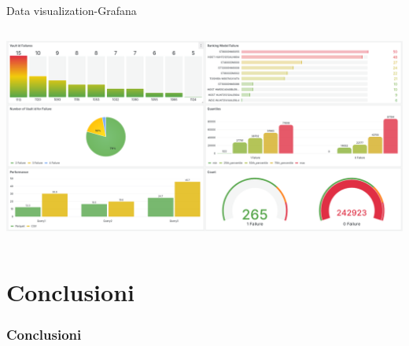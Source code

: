 \documentclass[13pt,aspectratio=169,t,xcolor=table]{beamer}
\begin{document}
\begin{frame}{Data visualization-Grafana}
\begin{columns}
\begin{minipage}{1\textwidth}
                \begin{adjustbox}{margin=0cm 0cm 1.5cm 0cm, center}
                    \includegraphics[width=1\textwidth]{res/grafana_dashboard.png}
                \end{adjustbox}
            \end{minipage}
    \end{columns}
\end{frame}

\section{Conclusioni}
\begin{frame}{}
    \frametitle{Conclusioni}
\end{frame}

\end{document}
